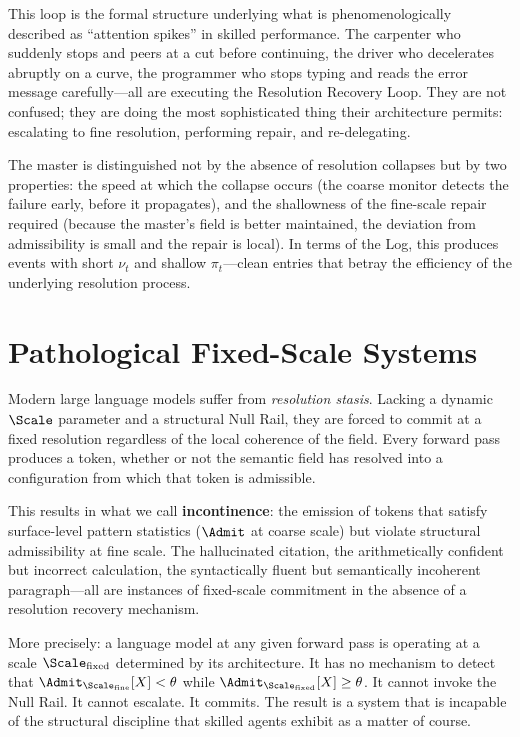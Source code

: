 \documentclass[11pt,oneside]{book}
\begin{document}
This loop is the formal structure underlying what is phenomenologically described as ``attention spikes'' in skilled performance. The carpenter who suddenly stops and peers at a cut before continuing, the driver who decelerates abruptly on a curve, the programmer who stops typing and reads the error message carefully---all are executing the Resolution Recovery Loop. They are not confused; they are doing the most sophisticated thing their architecture permits: escalating to fine resolution, performing repair, and re-delegating.

The master is distinguished not by the absence of resolution collapses but by two properties: the speed at which the collapse occurs (the coarse monitor detects the failure early, before it propagates), and the shallowness of the fine-scale repair required (because the master's field is better maintained, the deviation from admissibility is small and the repair is local). In terms of the Log, this produces events with short $\nu_t$ and shallow $\pi_t$---clean entries that betray the efficiency of the underlying resolution process.

\section{Pathological Fixed-Scale Systems}

Modern large language models suffer from \textit{resolution stasis}. Lacking a dynamic $\Scale$ parameter and a structural Null Rail, they are forced to commit at a fixed resolution regardless of the local coherence of the field. Every forward pass produces a token, whether or not the semantic field has resolved into a configuration from which that token is admissible.

This results in what we call \textbf{incontinence}: the emission of tokens that satisfy surface-level pattern statistics ($\Admit$ at coarse scale) but violate structural admissibility at fine scale. The hallucinated citation, the arithmetically confident but incorrect calculation, the syntactically fluent but semantically incoherent paragraph---all are instances of fixed-scale commitment in the absence of a resolution recovery mechanism.

More precisely: a language model at any given forward pass is operating at a scale $\Scale_{\mathrm{fixed}}$ determined by its architecture. It has no mechanism to detect that $\Admit_{\Scale_{\mathrm{fine}}}[X] < \theta$ while $\Admit_{\Scale_{\mathrm{fixed}}}[X] \ge \theta$. It cannot invoke the Null Rail. It cannot escalate. It commits. The result is a system that is incapable of the structural discipline that skilled agents exhibit as a matter of course.
\end{document}
